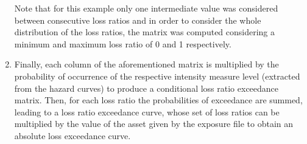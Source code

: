 \begin{enumerate}
Note that for this example only one intermediate value was considered between consecutive loss ratios and in order to consider the whole distribution of the loss ratios, the matrix was computed considering a minimum and maximum loss ratio of 0 and 1 respectively.

\item Finally, each column of the aforementioned matrix is multiplied by the probability of occurrence of the respective intensity measure level (extracted from the hazard curves) to produce a conditional loss ratio exceedance matrix.  Then, for each loss ratio the probabilities of exceedance are summed, leading to a loss ratio exceedance curve, whose set of loss ratios can be multiplied by the value of the asset given by the exposure file to obtain an absolute loss exceedance curve.

\end{enumerate}
